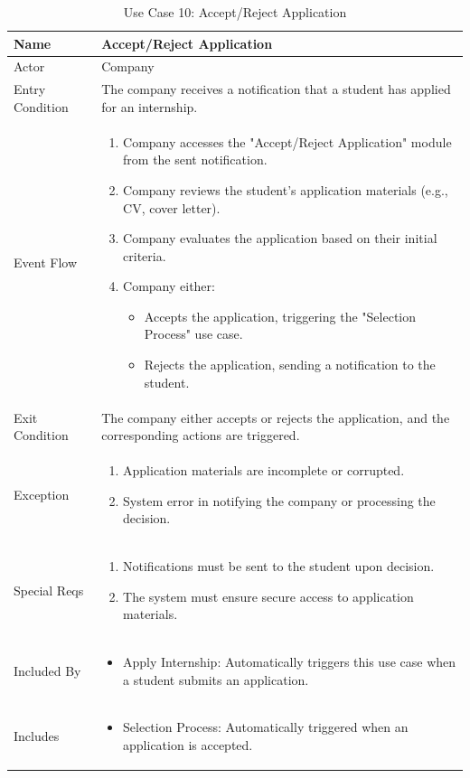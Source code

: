 \begin{table}[H]
\centering
\begin{tabular}{|l|p{12cm}|}
\hline
Name             & Accept/Reject Application \\ \hline
Actor            & Company \\ \hline
Entry Condition  & 
The company receives a notification that a student has applied for an internship. \\ \hline
Event Flow       & 
\begin{enumerate}
    \item Company accesses the "Accept/Reject Application" module from the sent notification.
    \item Company reviews the student's application materials (e.g., CV, cover letter).
    \item Company evaluates the application based on their initial criteria.
    \item Company either:
    \begin{itemize}
        \item Accepts the application, triggering the "Selection Process" use case.
        \item Rejects the application, sending a notification to the student.
    \end{itemize}
\end{enumerate} \\ \hline
Exit Condition   & 
The company either accepts or rejects the application, and the corresponding actions are triggered. \\ \hline
Exception        & 
\begin{enumerate}
    \item Application materials are incomplete or corrupted.
    \item System error in notifying the company or processing the decision.
\end{enumerate} \\ \hline
Special Reqs     & 
\begin{enumerate}
    \item Notifications must be sent to the student upon decision.
    \item The system must ensure secure access to application materials.
\end{enumerate} \\ \hline
Included By      & 
\begin{itemize}
    \item Apply Internship: Automatically triggers this use case when a student submits an application.
\end{itemize} \\ \hline
Includes         & 
\begin{itemize}
    \item Selection Process: Automatically triggered when an application is accepted.
\end{itemize} \\ \hline
\end{tabular}
\caption{Use Case 10: Accept/Reject Application}
\label{tab:accept_reject_application}
\end{table}




